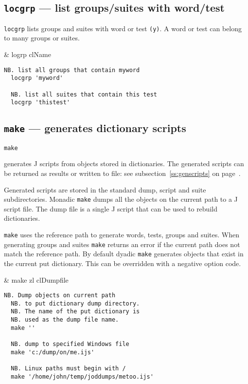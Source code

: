 \subsection{\texttt{locgrp} --- list groups/suites with word/test}\label{ss:locgrp}

\texttt{locgrp} lists groups and suites with word or test \texttt{(y)}.   
A word or test can belong to many groups or suites. 

\begin{wordhead}
\monad & logrp clName \\
\end{wordhead} 
\begin{lstlisting}[frame=single,framerule=0pt]  
  NB. list all groups that contain myword
  locgrp 'myword' 

  NB. list all suites that contain this test
  locgrp 'thistest' 
\end{lstlisting}


\subsection{\texttt{make} --- generates dictionary scripts}\label{ss:make}

\hypertarget{il:make}{\texttt{make}} generates J 
scripts from objects stored
in dictionaries.
The generated scripts can be returned as results or written to file: 
see subsection~\ref{ss:genscripts} on page~\pageref{ss:genscripts}.

Generated scripts are stored in the standard dump, 
script and suite subdirectories.  Monadic \texttt{make} dumps all the objects 
on the current path to a J script file.  The dump file is a single J script 
that can be used to rebuild dictionaries. 

\texttt{make} uses the reference path to generate words, 
tests, groups and suites.
When generating groups and suites \texttt{make} returns an error if the current 
path does not match the reference path. By default dyadic \texttt{make} generates 
objects that exist in the current put dictionary. 
This can be overridden with a negative option code. 

\begin{wordhead}
\monad & make zl \argsep clDumpfile \\
\end{wordhead}
\begin{lstlisting}[frame=single,framerule=0pt] 
  NB. Dump objects on current path 
  NB. to put dictionary dump directory.
  NB. The name of the put dictionary is 
  NB. used as the dump file name.
  make '' 

  NB. dump to specified Windows file
  make 'c:/dump/on/me.ijs'
  
  NB. Linux paths must begin with /
  make '/home/john/temp/joddumps/metoo.ijs'
\end{lstlisting}

